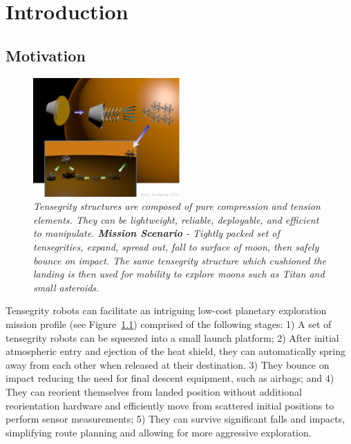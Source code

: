 \chapter{Introduction}

\section{Motivation}

\begin{figure}[htb]
   \centering
   \includegraphics[width=0.5\textwidth]{tex/img/fig_aeroshell_summary} 
   \caption{{\em Tensegrity structures are composed of pure compression and tension elements. They can be lightweight, reliable, deployable, and efficient to manipulate. {\bf Mission Scenario} - Tightly packed set of tensegrities, expand, spread out, fall to surface of moon, then safely bounce on impact. The same tensegrity structure which cushioned the landing is then used for mobility to explore moons such as Titan and small asteroids.}}
   \label{fig:unpack}
\end{figure}

Tensegrity robots can facilitate an intriguing low-cost planetary exploration mission profile (see Figure~\ref{fig:unpack}) comprised of the following stages:  1) A set of tensegrity robots can be squeezed into a small launch platform; 2)  After initial atmospheric entry and ejection of the heat shield, they can automatically spring away from each other when released at their destination. 3) They bounce on impact reducing the need for final descent equipment, such as airbags; and 4) They can reorient themselves from landed position without additional reorientation hardware and efficiently move from scattered initial positions to perform sensor measurements; 5) They can survive significant falls and impacts, simplifying route planning and allowing for more aggressive exploration.

